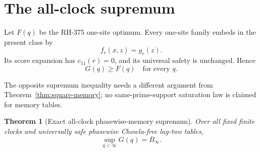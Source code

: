 \documentclass[11pt]{article}
\newtheorem{theorem}{Theorem}[section]
\theoremstyle{definition}
\theoremstyle{remark}
\begin{document}
\section{The all-clock supremum}

Let $F(q)$ be the RH-375 one-site optimum.  Every one-site family embeds in
the present class by
\begin{equation}
                         f_r(x,z)=g_r(z).
 \label{eq:one-site-embedding}
\end{equation}
Its score expansion has $c_{11}(r)=0$, and its universal safety is unchanged.
Hence
\begin{equation}
                         G(q)\ge F(q)\quad\text{for every }q.
 \label{eq:lower-embedding}
\end{equation}

The opposite supremum inequality needs a different argument from
Theorem~\ref{thm:square-memory}; no same-prime-support saturation law is
claimed for memory tables.

\begin{theorem}[Exact all-clock phasewise-memory supremum]
\label{thm:all-clock}
Over all fixed finite clocks and universally safe phasewise Chowla-free
lag-two tables,
\begin{equation}
                  \boxed{\displaystyle\sup_{q<\infty}G(q)=B_\infty.}
 \label{eq:all-clock}
\end{equation}
\end{theorem}
\end{document}
